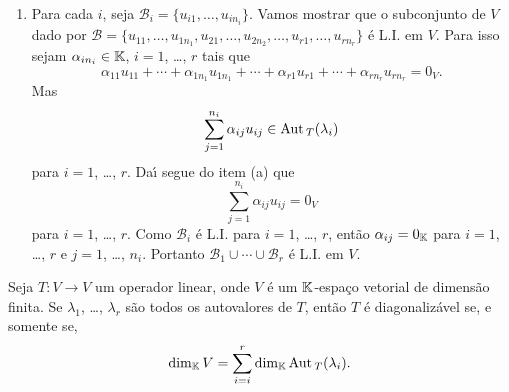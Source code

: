 \begin{prova}
\begin{enumerate}[label=({\roman*})]
		Aplicando $T$ em \eqref{equacaoauxiliar1} obtemos
		\begin{equation}\label{equacaoauxiliar2}
			0_V = T(u_1) + T(u_2) + \cdots + T(u_r) = \lambda_1u_1 + \lambda_2u_2 + \cdots + \lambda_ru_r.
		\end{equation}
		Agora multiplicando \eqref{equacaoauxiliar1} por $\lambda_1$ e subtraindo de \eqref{equacaoauxiliar2} obtemos
		\begin{align*}
			\lambda_1u_2 + \lambda_1u_r - \lambda_2u_2 - \cdots - \lambda_ru_r = 0_V\\
			(\lambda_1 - \lambda_2)u_2 - \cdots - (\lambda_1 - \lambda_r)u_r = 0_V.
		\end{align*}
		Mas por hip\'otese de indu\c{c}\~ao, segue que $(\lambda_1 - \lambda_i)u_i = 0$ para $i = 2$, \dots, $r$. Como $\lambda_i \ne \lambda_j$ se $i \ne j$, ent\~ao $\lambda_1 - \lambda_i \ne 0_\cp{K}$ e ent\~ao $u_i = 0_V$ para $i = 2$, \dots, $r$. Logo $u_1 = 0_V$ e o resultado est\'a provado.
		\item Para cada $i$, seja $\mathcal{B}_i = \{u_{i1}, \dots, u_{in_i}\}$. Vamos mostrar que o subconjunto de $V$ dado por $\mathcal{B} = \{u_{11}, \dots, u_{1n_1}, u_{21}, \dots, u_{2n_2}, \dots, u_{r1}, \dots, u_{rn_r}\}$ \'e L.I. em $V$. Para isso sejam $\alpha_{in_i} \in \mathbb{K}$, $i = 1$, \dots, $r$ tais que
		\[
			\alpha_{11}u_{11} + \cdots + \alpha_{1n_1}u_{1n_1} + \cdots + \alpha_{r1}u_{r1} + \cdots + \alpha_{rn_r}u_{rn_r} = 0_V.
		\]
		Mas
		\[
			\sum_{j = 1}^{n_i}\alpha_{ij}u_{ij} \in {\rm Aut\,}_T(\lambda_i)
		\]
		para $i = 1$, \dots, $r$. Da{\'\i} segue do item (a) que
		\[
			\sum_{j = 1}^{n_i}\alpha_{ij}u_{ij} = 0_V
		\]
		para $i = 1$, \dots, $r$. Como $\mathcal{B}_i$ \'e L.I. para $i = 1$, \dots, $r$, ent\~ao $\alpha_{ij} = 0_{\mathbb{K}}$ para $i = 1$, \dots, $r$ e $j = 1$, \dots, $n_i$. Portanto $\mathcal{B}_1 \cup \cdots \cup \mathcal{B}_r$ \'e L.I. em $V$.
	\end{enumerate}
\end{prova}

\begin{corolario}
	Seja $T : V \to V$ um operador linear, onde $V$ \'e um $\mathbb{K}$-espa\c{c}o vetorial de dimens\~ao finita. Se $\lambda_1$, \dots, $\lambda_r$ s\~ao todos os autovalores de $T$, ent\~ao $T$ \'e diagonaliz\'avel se, e somente se,
	\[
		\dim_{\mathbb{K}} V = \sum_{i = i}^r\dim_{\mathbb{K}}{\rm Aut\,}_T(\lambda_i).
	\]
\end{corolario}

